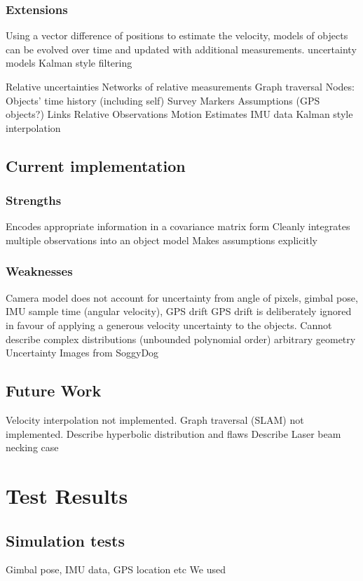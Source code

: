 \documentclass[a4paper, 11pt, titlepage]{article}
\begin{document}
    \subsubsection{Extensions}
      Using a vector difference of positions to estimate the velocity, models of objects can be evolved over time and updated with additional measurements.  uncertainty models
      Kalman style filtering
      
      Relative uncertainties
      Networks of relative measurements
      Graph traversal
        Nodes:
          Objects' time history (including self)
            Survey Markers
          Assumptions (GPS objects?)
        Links
          Relative Observations
          Motion Estimates
            IMU data
            Kalman style interpolation
  \subsection{Current implementation}
    \subsubsection{Strengths}
      Encodes appropriate information in a covariance matrix form
      Cleanly integrates multiple observations into an object model
      Makes assumptions explicitly
    \subsubsection{Weaknesses}
      Camera model does not account for uncertainty from angle of pixels, gimbal pose, IMU sample time (angular velocity), GPS drift
      GPS drift is deliberately ignored in favour of applying a generous velocity uncertainty to the objects.
      Cannot describe complex distributions (unbounded polynomial order)
        arbitrary geometry Uncertainty Images from SoggyDog
  \subsection{Future Work}
      Velocity interpolation not implemented.
      Graph traversal (SLAM) not implemented.
      Describe hyperbolic distribution and flaws
      Describe Laser beam necking case



\section{Test Results}

  \subsection{Simulation tests}
    Gimbal pose, IMU data, GPS location etc
    We used 
\end{document}
